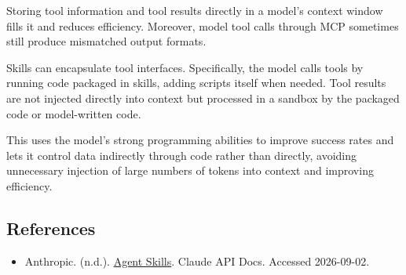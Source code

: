 Storing tool information and tool results directly in a model's context window fills it and reduces efficiency. Moreover, model tool calls through MCP sometimes still produce mismatched output formats.

Skills can encapsulate tool interfaces. Specifically, the model calls tools by running code packaged in skills, adding scripts itself when needed. Tool results are not injected directly into context but processed in a sandbox by the packaged code or model-written code.

This uses the model's strong programming abilities to improve success rates and lets it control data indirectly through code rather than directly, avoiding unnecessary injection of large numbers of tokens into context and improving efficiency.

\FloatBarrier
{}
\hypertarget{references-124}{%
\subsection{References}\label{references-124}}

\vspace{0.25em}
\begin{itemize}
\tightlist
\item
  Anthropic. (n.d.). \href{https://platform.claude.com/docs/en/agents-and-tools/agent-skills/overview}{Agent Skills}. Claude API Docs. Accessed 2026-09-02.
\end{itemize}

\clearpage
